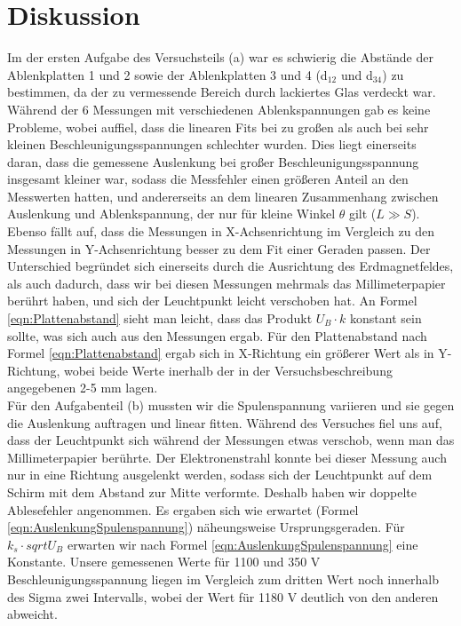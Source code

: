 \documentclass[12pt]{scrartcl}
\begin{document}
\newpage
\section{Diskussion}

Im der ersten Aufgabe des Versuchsteils (a)
war es schwierig die Abstände der Ablenkplatten 1 und 2 sowie der Ablenkplatten 3 und 4 (d$_{12}$ und d$_{34}$) zu bestimmen, da der zu vermessende Bereich  durch lackiertes Glas verdeckt war.\\
Während der 6 Messungen mit verschiedenen Ablenkspannungen gab es keine Probleme, wobei auffiel, dass die linearen Fits bei zu großen als auch bei sehr kleinen Beschleunigungsspannungen schlechter wurden.
Dies liegt einerseits daran, dass die gemessene Auslenkung bei großer Beschleunigungsspannung insgesamt kleiner war, sodass die Messfehler einen größeren Anteil an den Messwerten hatten, und andererseits an dem linearen Zusammenhang zwischen Auslenkung und Ablenkspannung, der nur für kleine Winkel $\theta$ gilt ($L \gg S$).
Ebenso fällt auf, dass die Messungen in X-Achsenrichtung im Vergleich zu den Messungen in Y-Achsenrichtung besser zu dem Fit einer Geraden passen. Der Unterschied begründet sich einerseits durch die Ausrichtung des Erdmagnetfeldes, als auch dadurch, dass wir bei diesen Messungen mehrmals das Millimeterpapier berührt haben, und sich der Leuchtpunkt leicht verschoben hat.
An Formel \ref{eqn:Plattenabstand} sieht man leicht, dass das Produkt $U_B \cdot k$ konstant sein sollte, was sich auch aus den Messungen ergab.
Für den Plattenabstand nach Formel \ref{eqn:Plattenabstand} ergab sich in X-Richtung ein größerer Wert als in Y-Richtung, wobei beide Werte inerhalb der in der Versuchsbeschreibung angegebenen 2-5 mm lagen.\\
Für den Aufgabenteil (b) mussten wir die Spulenspannung variieren und sie gegen die Auslenkung auftragen und linear fitten.
Während des Versuches fiel uns auf, dass der Leuchtpunkt sich während der Messungen etwas verschob, wenn man das Millimeterpapier berührte. Der Elektronenstrahl konnte bei dieser Messung auch nur in eine Richtung ausgelenkt werden, sodass sich der Leuchtpunkt auf dem Schirm mit dem Abstand zur Mitte verformte. Deshalb haben wir doppelte Ablesefehler angenommen.
Es ergaben sich wie erwartet (Formel \ref{eqn:AuslenkungSpulenspannung}) näheungsweise Ursprungsgeraden.
Für $k_s \cdot sqrt{U_B}$ erwarten wir nach Formel \ref{eqn:AuslenkungSpulenspannung} eine Konstante. Unsere gemessenen Werte für 1100 und 350 V Beschleunigungsspannung liegen im Vergleich zum dritten Wert noch innerhalb des Sigma zwei Intervalls, wobei der Wert für 1180 V deutlich von den anderen abweicht.
\end{document}
